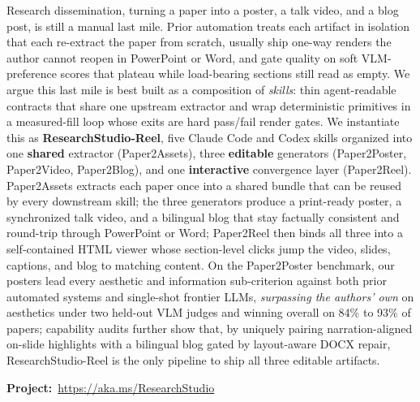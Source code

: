 \documentclass{article}
\renewenvironment{abstract}{}{}
\begin{document}
\begin{abstract}
\begin{mdframed}[backgroundcolor=abstractbg,
                 linewidth=0pt,
                 roundcorner=12pt,
                 leftmargin=12pt,
                 rightmargin=12pt,
                 innerleftmargin=16pt,
                 innerrightmargin=16pt,
                 innertopmargin=16pt,
                 innerbottommargin=16pt,
                 skipabove=8pt,
                 skipbelow=8pt]
\begingroup
\let\origtexttt\texttt
\renewcommand{\texttt}[1]{{\color{abstractcode}\origtexttt{#1}}}
\hypersetup{urlcolor=abstractlink}
\hypersetup{hidelinks}
Research dissemination, turning a paper into a poster, a talk video, and a blog post, is still a manual last mile.
Prior automation treats each artifact in isolation that each re-extract the paper from scratch, usually ship one-way renders the author cannot reopen in PowerPoint or Word, and gate quality on soft VLM-preference scores that plateau while load-bearing sections still read as empty.
We argue this last mile is best built as a composition of \emph{skills}: thin agent-readable contracts that share one upstream extractor and wrap deterministic primitives in a measured-fill loop whose exits are hard pass/fail render gates.
We instantiate this as \textbf{ResearchStudio-Reel}, five Claude Code and Codex skills organized into one \textbf{shared} extractor (Paper2Assets), three \textbf{editable} generators (Paper2Poster, Paper2Video, Paper2Blog), and one \textbf{interactive} convergence layer (Paper2Reel).
Paper2Assets extracts each paper once into a shared bundle that can be reused by every downstream skill; the three generators produce a print-ready poster, a synchronized talk video, and a bilingual blog that stay factually consistent and round-trip through PowerPoint or Word; Paper2Reel then binds all three into a self-contained HTML viewer whose section-level clicks jump the video, slides, captions, and blog to matching content.
On the Paper2Poster benchmark, our posters lead every aesthetic and information sub-criterion against both prior automated systems and single-shot frontier LLMs, \emph{surpassing the authors' own} on aesthetics under two held-out VLM judges and winning overall on 84\% to 93\% of papers; capability audits further show that, by uniquely pairing narration-aligned on-slide highlights with a bilingual blog gated by layout-aware DOCX repair, ResearchStudio-Reel is the only pipeline to ship all three editable artifacts.

\vspace{4pt}\noindent\textbf{Project:}~\href{https://aka.ms/ResearchStudio}{\color{abstractlink}https://aka.ms/ResearchStudio}
\endgroup
\end{mdframed}
\end{abstract}
\end{document}
